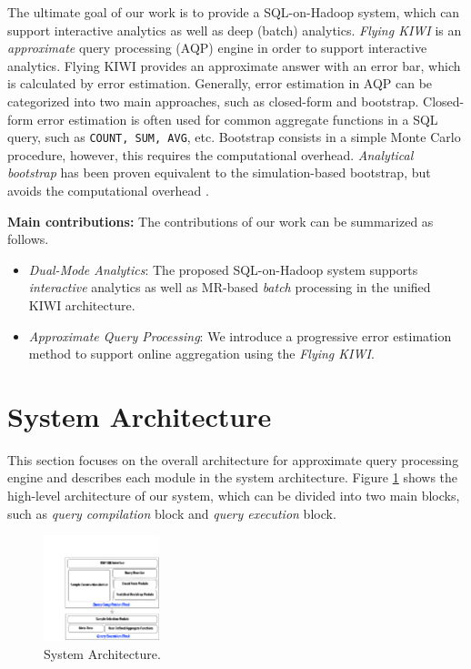 \documentclass{sig-alternate-05-2015}
\newcommand{\bi}{\begin{itemize}}
\newcommand{\ei}{\end{itemize}}
\newcommand{\ii}{\item}
\begin{document}
The ultimate goal of our work is to provide a SQL-on-Hadoop system, which can support interactive analytics as well as deep (batch) analytics. \textit{Flying KIWI} is an \textit{approximate} query processing (AQP) engine in order to support interactive analytics. Flying KIWI provides an approximate answer with an error bar, which is calculated by error estimation. 
Generally, error estimation in AQP can be categorized into two main approaches, such as closed-form and bootstrap.
Closed-form error estimation is often used for common aggregate functions in a SQL query, such as \texttt{COUNT, SUM, AVG}, etc. 
Bootstrap consists in a simple Monte Carlo procedure, however, this requires the computational overhead. 
\textit{Analytical bootstrap} has been proven equivalent to the simulation-based bootstrap, but avoids the computational overhead \cite{Agarwal:2014}.  

\noindent
\textbf{Main contributions:} 
The contributions of our work can be summarized as follows. 
\bi
\ii \textit{Dual-Mode Analytics}: 
The proposed SQL-on-Hadoop system supports \textit{interactive} analytics as well as MR-based \textit{batch} processing in the unified KIWI architecture.
\ii \textit{Approximate Query Processing}: 
We introduce a progressive error estimation method to support online aggregation using the \textit{Flying KIWI}.
\ei
\section{System Architecture}
This section focuses on the overall architecture for approximate query processing engine and describes each module in the system architecture. 
Figure \ref{fig:architecture} shows the high-level architecture of our system, which can be divided into two main blocks, such as \textit{query compilation} block and \textit{query execution} block.
\begin{figure}[htb]
        \centering
        \includegraphics[width=0.3\textwidth]{sys-architecture.pdf}
        \caption{System Architecture.}
        \label{fig:architecture}
\end{figure}
\end{document}
